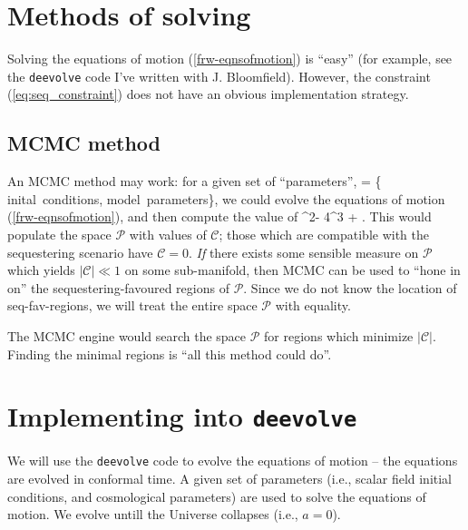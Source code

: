 \documentclass[amsmath,amssymb,12pt,eqsecnum]{revtex4}
\begin{document}
\section{Methods of solving}
Solving the equations of motion (\ref{frw-eqnsofmotion}) is ``easy'' (for example, see the  {\tt deevolve} code I've written with J. Bloomfield). However, the constraint (\ref{eq:seq_constraint}) does not have an obvious implementation strategy. 
\subsection{MCMC method}
An MCMC method may work: for a given set  of ``parameters'',
\bea
{}= \left\{ \mbox{inital conditions}, \mbox{model parameters}\right\},
\eea
we could evolve the equations of motion (\ref{frw-eqnsofmotion}), and then compute the value of 
\bea
{}  \langle\dot{\phi}^2\rangle - 4^3 \expec{\phi} + .
\eea
This would populate the space $\mathcal{P}$ with values of $\mathcal{C}$; those which are compatible with the sequestering scenario have $\mathcal{C}=0$. {\it If} there exists  some sensible measure on $\mathcal{P}$ which yields $|\mathcal{C}| \ll 1$ on some sub-manifold, then MCMC can be used to ``hone in on'' the sequestering-favoured regions of $\mathcal{P}$. Since we do not know the location of  seq-fav-regions, we will treat the entire space $\mathcal{P}$ with equality.

The MCMC engine would search the space $\mathcal{P}$ for regions which minimize $|\mathcal{C}|$. Finding the minimal regions is ``all this method could do''.
\section{Implementing into {\tt deevolve}}
We will use the {\tt deevolve} code to evolve the equations of motion -- the equations are evolved in conformal time. A given set of parameters (i.e., scalar field initial conditions, and cosmological parameters) are used to solve the equations of motion. We evolve untill the Universe collapses (i.e., $a=0$).
\end{document}
